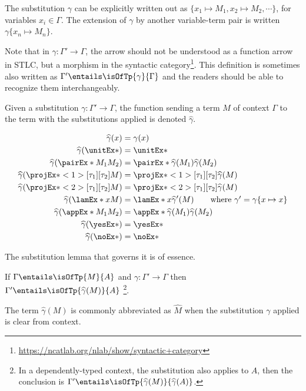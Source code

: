 \documentclass[letterpaper]{article}
\begin{document}
The substitution $\gamma$ can be explicitly written out as $\{x_1 \mapsto M_1, x_2  \mapsto M_2, \cdots \}$,
for variables $x_i \in \Gamma$. The extension of $\gamma$ by another variable-term pair is
written $\gamma\{x_n \mapsto M_n\}$.

Note that in $\gamma : \Gamma' \to \Gamma$, the arrow should not be understood as a function arrow in STLC, but a morphism in the syntactic category\footnote{\url{https://ncatlab.org/nlab/show/syntactic+category}}. This definition is sometimes also written as $\Gamma' \entails \isOfTp{\gamma}{\Gamma}$ and the readers should be able to recognize them interchangeably.

Given a substitution $\gamma : \Gamma' \to \Gamma$, the function
sending a term $M$ of context $\Gamma$ to the term with the substitutions applied is
denoted $\widehat{\gamma}$.

\begin{align*}
  \widehat{\gamma}(x) &= \gamma(x) \\
  \widehat{\gamma}(\unitEx*) &= \unitEx* \\
  \widehat{\gamma}(\pairEx*{M_1}{M_2}) &= \pairEx*{\widehat{\gamma}(M_1)}{\widehat{\gamma}(M_2)} \\
  \widehat{\gamma}(\fstEx*{M}) &= \fstEx*{\widehat{\gamma}(M)} \\
  \widehat{\gamma}(\sndEx*{M}) &= \sndEx*{\widehat{\gamma}(M)} \\
  \widehat{\gamma}(\lamEx*{x}{M}) &= \lamEx*{x}{\widehat{\gamma}
  '(M)} \tag*{where $\gamma' = \gamma\{x \mapsto x\}$} \\
  \widehat{\gamma}(\appEx*{M_1}{M_2}) &= \appEx*{\widehat{\gamma}(M_1)}{\widehat{\gamma}(M_2)} \\
  \widehat{\gamma}(\yesEx*) &= \yesEx* \\
  \widehat{\gamma}(\noEx*) &= \noEx*
\end{align*}

The substitution lemma that governs it is of essence.

\begin{lemma}\label{lem:subst}
If $\Gamma \entails \isOfTp{M}{A}$ and $\gamma : \Gamma' \to \Gamma$ then
$\Gamma' \entails \isOfTp{\widehat{\gamma}(M)}{A}$ \footnote{In a dependently-typed context, the substitution also applies to $A$, then the conclusion
is $\Gamma' \entails \isOfTp{\widehat{\gamma}(M)}{\widehat{\gamma}(A)}$.}.
\end{lemma}

The term $\widehat{\gamma}(M)$ is commonly abbreviated as $\widehat{M}$ when the substitution $\gamma$ applied
is clear from context.
\end{document}
